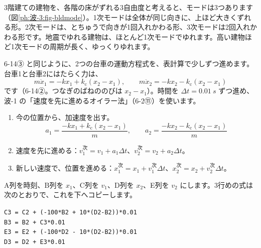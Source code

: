 \begin{phmijika}[ビルのモード]
3階建ての建物を、各階の床がずれる3自由度と考えると、モードは3つあります（図\ref{ph:波-3:fig-bldmode}）。1次モードは全体が同じ向きに、上ほど大きくずれる形。2次モードは、とちゅうで向きが1回入れかわる形、3次モードは2回入れかわる形です。地震でゆれる建物は、ほとんど1次モードでゆれます。高い建物ほど1次モードの周期が長く、ゆっくりゆれます。
\end{phmijika}
\begin{bkfigure}
\label{ph:波-3:fig-bldmode}
\end{bkfigure}


\label{ph:波-3:sec3}
6-14③ と同じように、2つの台車の運動方程式を、表計算で少しずつ進めます。台車1と台車2にはたらく力は、
\[m\ddot x_1=-kx_1+k_{\mathrm c}(x_2-x_1),\qquad m\ddot x_2=-kx_2-k_{\mathrm c}(x_2-x_1)\]
です（6-14②。つなぎのばねののびは $x_2-x_1$）。時間を $\Delta t=\qty{0.01}{s}$ ずつ進め、波-1 の「速度を先に進めるオイラー法」（6-2⑪）を使います。

\begin{enumerate}[label={\bkcircled{\arabic*}}, leftmargin=2.4\zw, itemsep=1pt, topsep=2pt]
\item 今の位置から、加速度を出す。
\[a_1=\frac{-kx_1+k_{\mathrm c}(x_2-x_1)}{m},\qquad a_2=\frac{-kx_2-k_{\mathrm c}(x_2-x_1)}{m}\]
\item 速度を先に進める：$v_1^{\text{次}}=v_1+a_1\Delta t$、$v_2^{\text{次}}=v_2+a_2\Delta t$。
\item 新しい速度で、位置を進める：$x_1^{\text{次}}=x_1+v_1^{\text{次}}\Delta t$、$x_2^{\text{次}}=x_2+v_2^{\text{次}}\Delta t$。
\end{enumerate}
A列を時刻、B列を $x_1$、C列を $v_1$、D列を $x_2$、E列を $v_2$ にします。3行めの式は次のとおりで、これを下へコピーします。
\begin{bkcenter}\small
\texttt{C3 = C2 + (-100*B2 + 10*(D2-B2))*0.01}\\\texttt{B3 = B2 + C3*0.01}\\
\texttt{E3 = E2 + (-100*D2 - 10*(D2-B2))*0.01}\\\texttt{D3 = D2 + E3*0.01}
\end{bkcenter}

